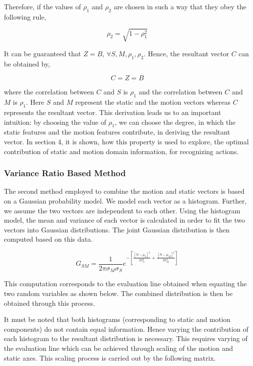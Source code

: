 Therefore, if the values of $\rho_{1}$ and $\rho_{2}$ are chosen in such a way that they obey the following
rule,

\begin{equation}
\rho_{2} = \sqrt{1-\rho_{1}^2}
\end{equation}

It can be guaranteed that $Z = B$, $\forall S,M,\rho_{1},\rho_{2}$. Hence, the resultant vector $C$ can be obtained
by,

\begin{equation}
C=Z=B
\end{equation}

where the correlation between $C$ and $S$ is $\rho_{1}$ and the correlation between $C$ and $M$ is $\rho_{1}$. Here $S$ and $M$ represent the static and the
motion vectors whereas $C$ represents the resultant vector. This derivation 
leads us to an important intuition: by choosing the value of $\rho_{1}$, we can
choose the degree, in which the static features and the motion features contribute,
in deriving the resultant vector. In section 4, it is shown, how this property is used to explore, the optimal contribution of 
static and motion domain information, for recognizing actions.

\subsubsection{Variance Ratio Based Method}

The second method employed to combine the motion and static vectors is based on a Gaussian probability model. We model each vector as a histogram. Further, we assume the two vectors are independent to each other. Using the histogram model, the mean and variance of each vector is calculated in order to fit the two vectors into Gaussian distributions. The joint Gaussian distribution is then computed based on this data.

\begin{equation}
G_{SM}= \frac{1}{2\pi\sigma_M\sigma_S} e^{-\left[\frac{[N-\mu_S]^2}{2\sigma_S^2}+ \frac{[N-\mu_M]^2}{2\sigma_M^2} \right]}
\end{equation}

This computation corresponds to the evaluation line obtained when equating the two random variables as shown below. The combined distribution is then be obtained through this process.

It must be noted that both histograms (corresponding to static and motion components) do not contain equal information. Hence varying the contribution of each histogram to the resultant distribution is necessary. This requires varying of the evaluation line which can be achieved through scaling of the motion and static axes. This scaling process is carried out by the following matrix.


